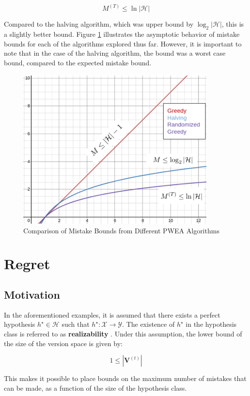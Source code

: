 \documentclass[11pt]{article}
\begin{document}
$$ M^{(T)} \leq \ln{|\mathcal{H}|}$$

Compared to the halving algorithm, which was upper bound by $\log_2 |\mathcal{H}|$, this is a slightly better bound. Figure \ref{fig:mistake-bound-comparison} illustrates the asymptotic behavior of mistake bounds for each of the algorithms explored thus far. However, it is important to note that in the case of the halving algorithm, the bound was a worst case bound, compared to the expected mistake bound.

\begin{figure}[H]
    \centering
    \includegraphics[width=10cm]{function_comparison.png}
    \caption{Comparison of  Mistake Bounds from Different PWEA Algorithms}
    \label{fig:mistake-bound-comparison}
\end{figure}

\section{Regret}\label{section:regret}

\subsection{Motivation}

In the aforementioned examples, it is assumed that there exists a perfect hypothesis $h^\star\in\mathcal{H}$ such that $h^\star:\mathcal{X}\rightarrow\mathcal{Y}$. The existence of $h^\star$ in the hypothesis class is referred to as \textbf{realizability} \cite{shalev-shwartz}. Under this assumption, the lower bound of the size of the version space is given by:

$$ 1 \leq |\boldsymbol{V}^{(t)}|$$

This makes it possible to place bounds on the maximum number of mistakes that can be made, as a function of the size of the hypothesis class.
\end{document}
